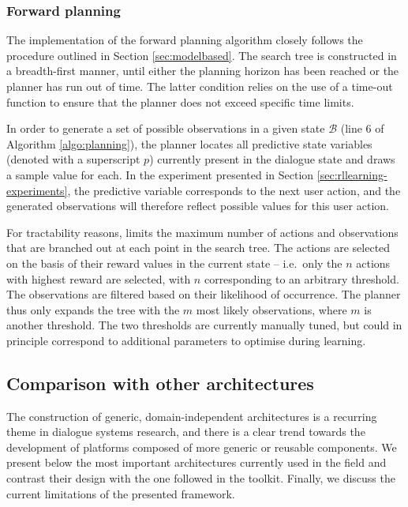 \subsubsection*{Forward planning}

The implementation of the forward planning algorithm closely follows the procedure outlined in Section \ref{sec:modelbased}.  The search tree is constructed in a breadth-first manner, until either the planning horizon has been reached or the planner has run out of time.  The latter condition relies on the use of a time-out function to ensure that the planner does not exceed specific time limits.

In order to generate a set of possible observations in a given state $\mathcal{B}$ (line 6 of Algorithm \ref{algo:planning}), the planner locates all predictive state variables (denoted with a superscript $p$) currently present in the dialogue state and draws a sample value for each.  In the experiment presented in Section \ref{sec:rllearning-experiments}, the predictive variable corresponds to the next user action, and the generated observations will therefore reflect possible values for this user action.

For tractability reasons, \opendial{} limits the maximum number of actions and observations that are branched out at each point in the search tree.  The actions are selected on the basis of their reward values in the current state -- i.e.\ only the $n$ actions with highest reward are selected, with $n$ corresponding to an arbitrary threshold. The observations are filtered based on their likelihood of occurrence.  The planner thus only expands the tree with the $m$ most likely observations, where $m$ is another threshold. The two thresholds are currently manually tuned, but could in principle correspond to additional parameters to optimise during learning. 

\subsection{Comparison with other architectures}
\label{sec:archi-comparison}

The construction of generic, domain-independent architectures is a recurring theme in dialogue systems research, and there is a clear trend towards the development of platforms composed of more generic or reusable components. We present below the most important architectures currently used in the field and contrast their design with the one followed in the \opendial{} toolkit. Finally, we discuss the current limitations of the presented framework.

